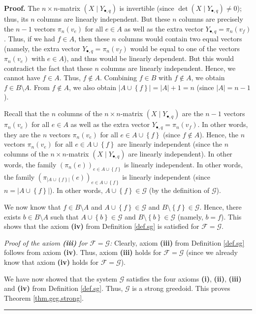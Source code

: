 \documentclass[numbers=enddot,12pt,final,onecolumn,notitlepage]{scrartcl}%
\theoremstyle{definition}
\newenvironment{proof}[1][Proof]{\noindent\textbf{#1.} }{\ \rule{0.5em}{0.5em}}
\theoremstyle{plainsl}
\begin{document}
\begin{proof}
The $n\times n$-matrix $\left(  X\mid Y_{\bullet,q}\right)  $ is invertible
(since $\det\left(  X\mid Y_{\bullet,q}\right)  \neq0$); thus, its $n$ columns
are linearly independent. But these $n$ columns are precisely the $n-1$
vectors $\pi_{n}\left(  v_{e}\right)  $ for all $e\in A$ as well as the extra
vector $Y_{\bullet,q}=\pi_{n}\left(  v_{f}\right)  $. Thus, if we had $f\in
A$, then these $n$ columns would contain two equal vectors (namely, the extra
vector $Y_{\bullet,q}=\pi_{n}\left(  v_{f}\right)  $ would be equal to one of
the vectors $\pi_{n}\left(  v_{e}\right)  $ with $e\in A$), and thus would be
linearly dependent. But this would contradict the fact that these $n$ columns
are linearly independent. Hence, we cannot have $f\in A$. Thus, $f\notin A$.
Combining $f\in B$ with $f\notin A$, we obtain $f\in B\setminus A$. From
$f\notin A$, we also obtain $\left\vert A\cup\left\{  f\right\}  \right\vert
=\left\vert A\right\vert +1=n$ (since $\left\vert A\right\vert =n-1$).

Recall that the $n$ columns of the $n\times n$-matrix $\left(  X\mid
Y_{\bullet,q}\right)  $ are the $n-1$ vectors $\pi_{n}\left(  v_{e}\right)  $
for all $e\in A$ as well as the extra vector $Y_{\bullet,q}=\pi_{n}\left(
v_{f}\right)  $. In other words, they are the $n$ vectors $\pi_{n}\left(
v_{e}\right)  $ for all $e\in A\cup\left\{  f\right\}  $ (since $f\notin A$).
Hence, the $n$ vectors $\pi_{n}\left(  v_{e}\right)  $ for all $e\in
A\cup\left\{  f\right\}  $ are linearly independent (since the $n$ columns of
the $n\times n$-matrix $\left(  X\mid Y_{\bullet,q}\right)  $ are linearly
independent). In other words, the family $\left(  \pi_{n}\left(  e\right)
\right)  _{e\in A\cup\left\{  f\right\}  }$ is linearly independent. In other
words, the family $\left(  \pi_{\left\vert A\cup\left\{  f\right\}
\right\vert }\left(  e\right)  \right)  _{e\in A\cup\left\{  f\right\}  }$ is
linearly independent (since $n=\left\vert A\cup\left\{  f\right\}  \right\vert
$). In other words, $A\cup\left\{  f\right\}  \in\mathcal{G}$ (by the
definition of $\mathcal{G}$).

We now know that $f\in B\setminus A$ and $A\cup\left\{  f\right\}
\in\mathcal{G}$ and $B\setminus\left\{  f\right\}  \in\mathcal{G}$. Hence,
there exists $b\in B\setminus A$ such that $A\cup\left\{  b\right\}
\in\mathcal{G}$ and $B\setminus\left\{  b\right\}  \in\mathcal{G}$ (namely,
$b=f$). This shows that the axiom \textbf{(iv)} from Definition \ref{def.sg}
is satisfied for $\mathcal{F}=\mathcal{G}$. \medskip

\textit{Proof of the axiom \textbf{(iii)} for }$\mathcal{F}=\mathcal{G}%
$\textit{:} Clearly, axiom \textbf{(iii)} from Definition \ref{def.sg} follows
from axiom \textbf{(iv)}. Thus, axiom \textbf{(iii)} holds for $\mathcal{F}%
=\mathcal{G}$ (since we already know that axiom \textbf{(iv)} holds for
$\mathcal{F}=\mathcal{G}$). \medskip

We have now showed that the system $\mathcal{G}$ satisfies the four axioms
\textbf{(i)}, \textbf{(ii)}, \textbf{(iii)} and \textbf{(iv)} from Definition
\ref{def.sg}. Thus, $\mathcal{G}$ is a strong greedoid. This proves Theorem
\ref{thm.geg.strong}.
\end{proof}
\end{document}
